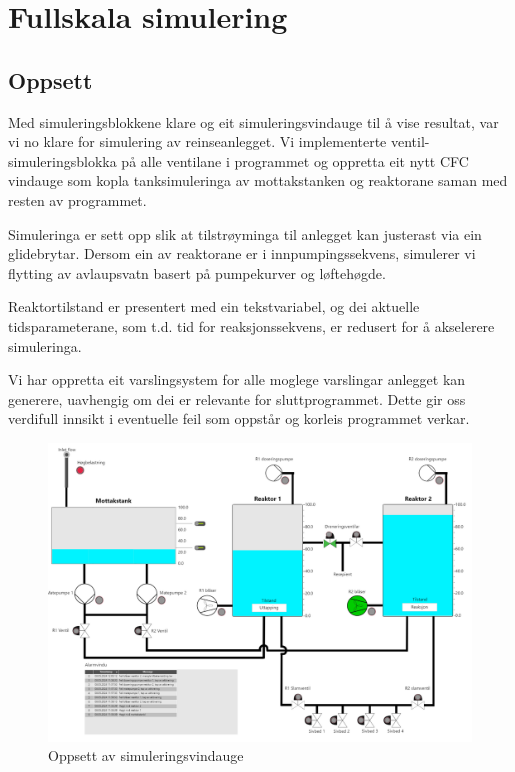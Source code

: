 \section{Fullskala simulering}
\subsection{Oppsett}
Med simuleringsblokkene klare og eit simuleringsvindauge til å vise resultat, var vi no klare for simulering av reinseanlegget.
Vi implementerte ventil-simuleringsblokka på alle ventilane i programmet og oppretta eit
nytt \gls{CFC} vindauge som kopla tanksimuleringa av mottakstanken og reaktorane saman med resten av
programmet.

Simuleringa er sett opp slik at tilstrøyminga til anlegget kan justerast via ein glidebrytar.
Dersom ein av reaktorane er i innpumpingssekvens, simulerer vi flytting av avlaupsvatn basert på pumpekurver og løftehøgde.

Reaktortilstand er presentert med ein tekstvariabel, og
dei aktuelle tidsparameterane, som t.d. tid for reaksjonssekvens,
er redusert for å akselerere simuleringa.

Vi har oppretta eit varslingsystem for alle moglege varslingar anlegget kan generere, uavhengig om dei er relevante for sluttprogrammet.
Dette gir oss verdifull innsikt i eventuelle feil som oppstår og korleis programmet verkar.

\thispagestyle{fancy}
\begin{figure}[htbp]
    \centering
    \includegraphics[scale=0.45]{Bilder/Simuleringsbilde.png}
    \caption{Oppsett av simuleringsvindauge}\label{fig:Simulering}
\end{figure}

